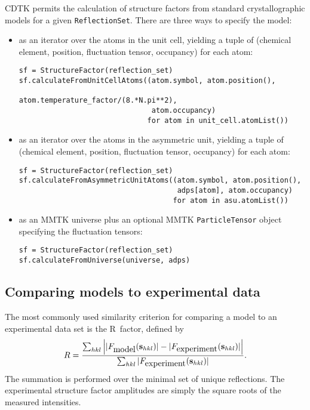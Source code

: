 \documentclass[12pt]{article}
\newcommand{\vect}[1]{{\bf #1}}
\newcommand{\vs}{\vect{s}}
\begin{document}
\begin{sloppy}
CDTK permits the calculation of structure factors from standard
crystallographic models for a given \texttt{ReflectionSet}.
There are three ways to specify the model:
\begin{itemize}
\item
as an iterator over the atoms in the unit cell, yielding a tuple
of (chemical element, position, fluctuation tensor, occupancy)
for each atom:
{\small
\begin{verbatim}
sf = StructureFactor(reflection_set)
sf.calculateFromUnitCellAtoms((atom.symbol, atom.position(),
                               atom.temperature_factor/(8.*N.pi**2),
                               atom.occupancy)
                              for atom in unit_cell.atomList())
\end{verbatim}
}
\item
as an iterator over the atoms in the asymmetric unit, yielding a tuple
of (chemical element, position, fluctuation tensor, occupancy)
for each atom:
{\small
\begin{verbatim}
sf = StructureFactor(reflection_set)
sf.calculateFromAsymmetricUnitAtoms((atom.symbol, atom.position(),
                                     adps[atom], atom.occupancy)
                                    for atom in asu.atomList())
\end{verbatim}
}
\item
as an MMTK universe plus an optional MMTK \texttt{ParticleTensor} object
specifying the fluctuation tensors:
{\small
\begin{verbatim}
sf = StructureFactor(reflection_set)
sf.calculateFromUniverse(universe, adps)
\end{verbatim}
}
\end{itemize}

\subsection{Comparing models to experimental data}

The most commonly used similarity criterion for comparing a model
to an experimental data set is the R~factor, defined by
\begin{equation}
R = \frac{\sum_{hkl}
    \left| |F_{\mbox{model}}(\vs_{hkl})|-|F_{\mbox{experiment}}(\vs_{hkl})| \right|}
    {\sum_{hkl} |F_{\mbox{experiment}}(\vs_{hkl})|}.
\end{equation}
The summation is performed over the minimal set of unique reflections.
The experimental structure factor amplitudes are simply the square roots
of the measured intensities.


\end{sloppy}
\end{document}
